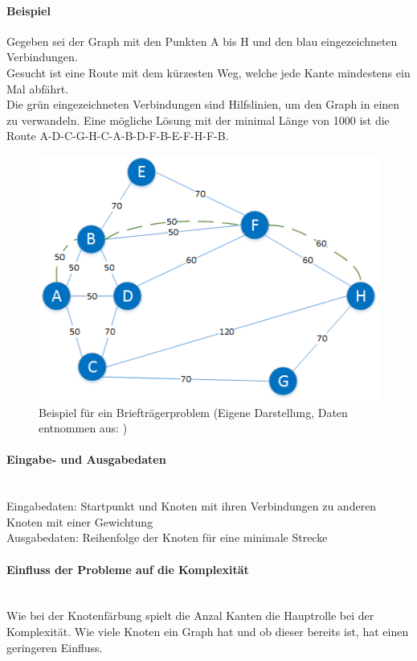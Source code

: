 	\paragraph{Beispiel} Gegeben sei der Graph mit den Punkten A bis H und den blau eingezeichneten Verbindungen.\\
Gesucht ist eine Route mit dem kürzesten Weg, welche jede Kante mindestens ein Mal abfährt. \cite{pearson2004decision}\\
Die grün eingezeichneten Verbindungen sind Hilfslinien, um den Graph in einen  zu verwandeln. Eine mögliche Lösung mit der minimal Länge von 1000 ist die 
Route A-D-C-G-H-C-A-B-D-F-B-E-F-H-F-B.
\begin{figure}[h]
\centering
\includegraphics[scale=0.8]{images/visio/chinese_postman.png}
\caption[Beispiel für ein Briefträgerproblem]{Beispiel für ein Briefträgerproblem (Eigene Darstellung, Daten entnommen aus: \cite{pearson2004decision})}
\label{fig:chinese_postman_example}
\end{figure}

	\paragraph{Eingabe- und Ausgabedaten}\mbox{}\\
	Eingabedaten: Startpunkt und Knoten mit ihren Verbindungen zu anderen Knoten mit einer Gewichtung\\
	Ausgabedaten: Reihenfolge der Knoten für eine minimale Strecke

	\paragraph{Einfluss der Probleme auf die Komplexität}\mbox{}\\
	Wie bei der Knotenfärbung spielt die Anzal Kanten die Hauptrolle bei der Komplexität. Wie viele Knoten ein Graph hat und ob dieser bereits  ist, hat einen 
	geringeren Einfluss.

